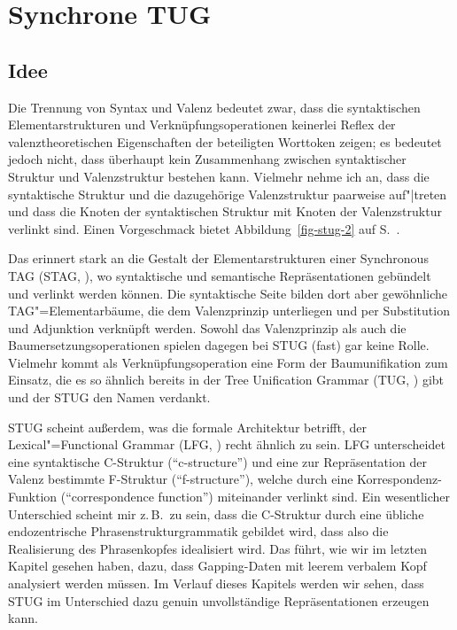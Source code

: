 \section{Synchrone TUG} \label{sec-stug-intro}

\subsection{Idee}

Die Trennung von Syntax und Valenz bedeutet zwar, dass die syntaktischen Elementarstrukturen und Verknüpfungsoperationen keinerlei Reflex der valenztheoretischen Eigenschaften der beteiligten Worttoken zeigen; es bedeutet jedoch nicht, dass überhaupt kein Zusammenhang zwischen syntaktischer Struktur und Valenzstruktur bestehen kann. Vielmehr nehme ich an, dass die syntaktische Struktur und die dazugehörige Valenzstruktur paarweise auf"|treten und dass die Knoten der syntaktischen Struktur mit Knoten der Valenzstruktur verlinkt sind. Einen Vorgeschmack bietet Abbildung~\ref{fig-stug-2} auf S.~\pageref{fig-stug-2}.  

Das erinnert stark an die Gestalt der Elementarstrukturen einer Synchronous TAG (STAG, \citealt{Shieber:Schabes:90,Shieber:94,Nesson:Shieber:08}), wo syntaktische und semantische Repräsentationen gebündelt und verlinkt werden können. Die syntaktische Seite bilden dort aber gewöhnliche TAG"=Elementarbäume, die dem Valenzprinzip unterliegen und per Substitution und Adjunktion verknüpft werden. Sowohl das Valenzprinzip als auch die Baumersetzungsoperationen spielen dagegen bei STUG (fast) gar keine Rolle. Vielmehr kommt als Verknüpfungsoperation eine Form der Baumunifikation zum Einsatz, die es so ähnlich bereits in der Tree Unification Grammar (TUG, \citealt{Popowich:89,Gerdes:04}) gibt und der STUG den Namen verdankt.

STUG scheint außerdem, was die formale Architektur betrifft, der Lexical"=Functional Grammar (LFG, \citealt{Kaplan:Bresnan:82,Dalrymple:01,Asudeh:Toivonen:09}) recht ähnlich zu sein. LFG unterscheidet eine syntaktische C-Struktur ("`c-structure"') und eine zur Repräsentation der Valenz bestimmte F-Struktur ("`f-structure"'), welche durch eine Korrespondenz-Funktion ("`correspondence function"') miteinander verlinkt sind. Ein wesentlicher Unterschied scheint mir z.\,B.\ zu sein, dass die C-Struktur durch eine übliche endozentrische Phrasenstrukturgrammatik gebildet wird, dass also die Realisierung des Phrasenkopfes idealisiert wird. Das führt, wie wir im letzten Kapitel gesehen haben, dazu, dass Gapping-Daten mit leerem verbalem Kopf analysiert werden müssen. Im Verlauf dieses Kapitels werden wir sehen, dass STUG im Unterschied dazu genuin unvollständige Repräsentationen erzeugen kann.


